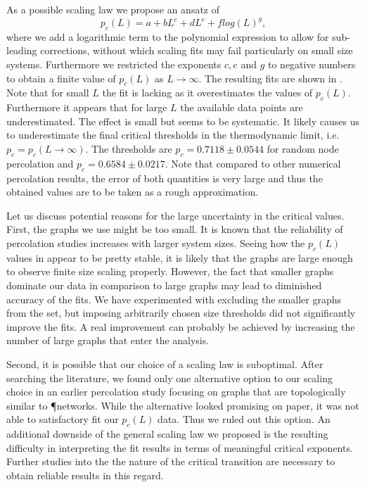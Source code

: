		As a possible scaling law we propose an ansatz of
		\begin{equation}
			p_c(L) = a + b L^{c} + d L^{e} + f log(L)^{g},
		\end{equation}
		where we add a logarithmic term to the polynomial expression to allow for sub-leading corrections, without which scaling fits may fail particularly on small size systems. Furthermore we restricted the exponents $c,e$ and $g$ to negative numbers to obtain a finite value of $p_c(L)$ as $L \to \infty$. The resulting fits are shown in . Note that for small $L$ the fit is lacking as it overestimates the values of $p_c(L)$.  Furthermore it appears that for large $L$ the available data points are underestimated. The effect is small but seems to be systematic. It likely causes us to underestimate the final critical thresholds in the thermodynamic limit, i.e.\ $ p_c = p_c(L \to \infty)$. The thresholds are $p_c = 0.7118 \pm 0.0544$ for random node percolation and $p_c = 0.6584 \pm 0.0217$. Note that compared to other numerical percolation results, the error of both quantities is very large and thus the obtained values are to be taken as a rough approximation.

		Let us discuss potential reasons for the large uncertainty in the critical values. First, the graphs we use might be too small. It is known that the reliability of percolation studies increases with larger system sizes. Seeing how the $p_c(L)$ values in  appear to be pretty stable, it is likely that the graphs are large enough to observe finite size scaling properly. However, the fact that smaller graphs dominate our data in comparison to large graphs may lead to diminished accuracy of the fits. We have experimented with excluding the smaller graphs from the set, but imposing arbitrarily chosen size thresholds did not significantly improve the fits. A real improvement can probably be achieved by increasing the number of large graphs that enter the analysis.

		Second, it is possible that our choice of a scaling law is suboptimal. After searching the literature, we found only one alternative option to our scaling choice in an earlier percolation study focusing on graphs that are topologically similar to \P networks. While the alternative looked promising on paper, it was not able to satisfactory fit our $p_c(L)$ data. Thus we ruled out this option. An additional downside of the general scaling law we proposed is the resulting difficulty in interpreting the fit results in terms of meaningful critical exponents. Further studies into the the nature of the critical transition are necessary to obtain reliable results in this regard.

